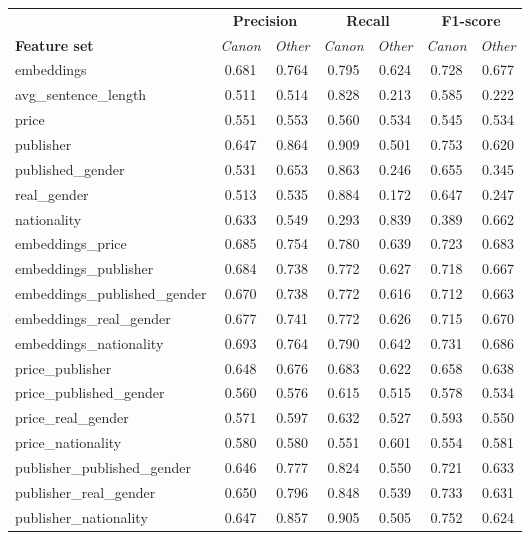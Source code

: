 
\begin{table*}
    \centering
    \small
    \begin{tabular}{l|cc|cc|cc}
    \toprule
    & \multicolumn{2}{c|}{\textbf{Precision}} & \multicolumn{2}{c|}{\textbf{Recall}} & \multicolumn{2}{c}{\textbf{F1-score}} \\
    \textbf{Feature set} & \textit{Canon} & \textit{Other} & \textit{Canon}  & \textit{Other} & \textit{Canon}  & \textit{Other} \\
    \midrule
    embeddings & 0.681 & 0.764 & 0.795 & 0.624 & 0.728 & 0.677 \\
    avg_sentence_length & 0.511 & 0.514 & 0.828 & 0.213 & 0.585 & 0.222 \\
    price & 0.551 & 0.553 & 0.560 & 0.534 & 0.545 & 0.534 \\
    publisher & 0.647 & 0.864 & 0.909 & 0.501 & 0.753 & 0.620 \\
    published_gender & 0.531 & 0.653 & 0.863 & 0.246 & 0.655 & 0.345 \\
    real_gender & 0.513 & 0.535 & 0.884 & 0.172 & 0.647 & 0.247 \\
    nationality & 0.633 & 0.549 & 0.293 & 0.839 & 0.389 & 0.662 \\
    embeddings_price & 0.685 & 0.754 & 0.780 & 0.639 & 0.723 & 0.683 \\
    embeddings_publisher & 0.684 & 0.738 & 0.772 & 0.627 & 0.718 & 0.667 \\
    embeddings_published_gender & 0.670 & 0.738 & 0.772 & 0.616 & 0.712 & 0.663 \\
    embeddings_real_gender & 0.677 & 0.741 & 0.772 & 0.626 & 0.715 & 0.670 \\
    embeddings_nationality & 0.693 & 0.764 & 0.790 & 0.642 & 0.731 & 0.686 \\
    price_publisher & 0.648 & 0.676 & 0.683 & 0.622 & 0.658 & 0.638 \\
    price_published_gender & 0.560 & 0.576 & 0.615 & 0.515 & 0.578 & 0.534 \\
    price_real_gender & 0.571 & 0.597 & 0.632 & 0.527 & 0.593 & 0.550 \\
    price_nationality & 0.580 & 0.580 & 0.551 & 0.601 & 0.554 & 0.581 \\
    publisher_published_gender & 0.646 & 0.777 & 0.824 & 0.550 & 0.721 & 0.633 \\
    publisher_real_gender & 0.650 & 0.796 & 0.848 & 0.539 & 0.733 & 0.631 \\
    publisher_nationality & 0.647 & 0.857 & 0.905 & 0.505 & 0.752 & 0.624 \\

\end{tabular}
\end{table*}
